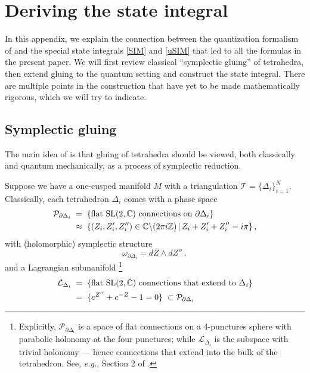 \documentclass[12pt]{amsart}
\newcommand{\lbl}{\label}
\theoremstyle{definition}
\def\SL{\mathrm{SL}}
\def\be{  \begin{equation} }
\def\ee{  \end{equation} }
\newcommand{\CT}{\mathcal{T}}
\newcommand{\CL}{\mathcal{L}}
\newcommand{\CP}{\mathcal{P}}
\newcommand{\C}{\mathbb{C}}
\newcommand{\Z}{\mathbb{Z}}
\newcommand{\eg}{\emph{e.g.}}
\newcommand{\pd}{\partial}
\numberwithin{equation}{section}
\begin{document}

\section{Deriving the state integral}
\lbl{app.SIM}

In this appendix, we explain the connection between the quantization 
formalism of \cite{D1} and the special state integrals \eqref{SIM} and 
\eqref{uSIM} that led to all the formulas in the present paper. We will 
first review classical ``symplectic gluing'' of tetrahedra, then extend 
gluing to the quantum setting and construct the state integral. There are 
multiple points in the construction that have yet to be made mathematically 
rigorous, which we will try to indicate.


\subsection{Symplectic gluing}
\label{sec.sympglue}

The main idea of \cite{D1} is that gluing of tetrahedra should be viewed, both classically and quantum mechanically, as a process of symplectic reduction.

Suppose we have a one-cusped manifold $M$ with a triangulation $\CT=\{\Delta_i\}_{i=1}^N$. Classically, each tetrahedron $\Delta_i$ comes with a phase space
%
\begin{align} \CP_{\pd\Delta_i} &\;=\;\{\text{flat $\SL(2,\C)$ connections on $\pd\Delta_i$}\} \notag\\ &\;\approx\; \{(Z_i,Z_i',Z_i'')\in \C\backslash(2\pi i\Z)\,|\,Z_i+Z_i'+Z_i''=i\pi\}\,, \end{align}
%
with (holomorphic) symplectic structure
%
\be \omega_{\pd \Delta_i} = dZ\wedge dZ''\,,\ee
%
and a Lagrangian submanifold%
%
\footnote{Explicitly, $\CP_{\pd\Delta_i}$ is a space of flat connections on a 4-punctures sphere with parabolic holonomy at the four punctures; while $\CL_{\Delta_i}$ is the subspace with trivial holonomy --- hence connections that extend into the bulk of the tetrahedron. See, \eg, Section 2 of \cite{DGG1}.}
%
\begin{align} \label{Lagtet} \CL_{\Delta_i} &\;=\; \{\text{flat $\SL(2,\C)$ connections that extend to $\Delta_i$}\} \notag\\ &\;=\; \{e^{Z''}+e^{-Z}-1=0\}\;\subset \CP_{\pd\Delta_i} \end{align}
\end{document}

